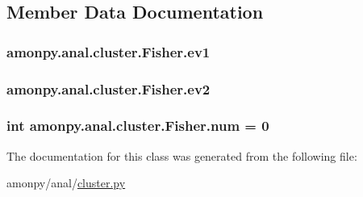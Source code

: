 \subsection{Member Data Documentation}
\hypertarget{classamonpy_1_1anal_1_1cluster_1_1_fisher_a38c295960480aaacc74561dc8f9ef2af}{
\subsubsection[{ev1}]{\setlength{\rightskip}{0pt plus 5cm}amonpy.\-anal.\-cluster.\-Fisher.\-ev1}}\label{classamonpy_1_1anal_1_1cluster_1_1_fisher_a38c295960480aaacc74561dc8f9ef2af}
\hypertarget{classamonpy_1_1anal_1_1cluster_1_1_fisher_ab2cce79b453ffcfced2266553ea60d19}{
\subsubsection[{ev2}]{\setlength{\rightskip}{0pt plus 5cm}amonpy.\-anal.\-cluster.\-Fisher.\-ev2}}\label{classamonpy_1_1anal_1_1cluster_1_1_fisher_ab2cce79b453ffcfced2266553ea60d19}
\hypertarget{classamonpy_1_1anal_1_1cluster_1_1_fisher_a2c44a65df3f24bc786522df8d5aa2db7}{
\subsubsection[{num}]{\setlength{\rightskip}{0pt plus 5cm}int amonpy.\-anal.\-cluster.\-Fisher.\-num = 0\hspace{0.3cm}{\ttfamily [static]}}}\label{classamonpy_1_1anal_1_1cluster_1_1_fisher_a2c44a65df3f24bc786522df8d5aa2db7}


The documentation for this class was generated from the following file\-:\begin{DoxyCompactItemize}
\item 
amonpy/anal/\hyperlink{cluster_8py}{cluster.\-py}\end{DoxyCompactItemize}
